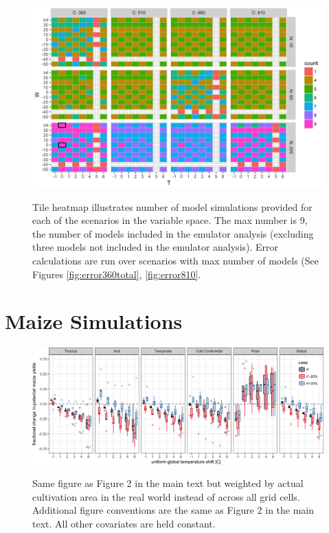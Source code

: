 \documentclass[10pt]{article}
\begin{document}
\begin{figure}[h!]
\includegraphics[width=\textwidth]{s_how_many_simulations.png}\\
\caption{Tile heatmap illustrates number of model simulations provided for each of the scenarios in the variable space. The max number is 9, the number of models included in the emulator analysis (excluding three models not included in the emulator analysis). Error calculations are run over scenarios with max number of models (See Figures \ref{fig:error360total}, \ref{fig:error810}.}
\label{fig:numbersims}
\end{figure}

\clearpage
\section{Maize Simulations}
\begin{figure}[h!]
\includegraphics[width=\textwidth]{s_maize_sim_CG_area_weight_rf.png}\\
\caption{Same figure as Figure 2 in the main text but weighted by actual cultivation area in the real world instead of across all grid cells. Additional figure conventions are the same as Figure 2 in the main text. All other covariates are held constant.}
\label{fig:KGirr_currentcult}
\end{figure}
\end{document}
